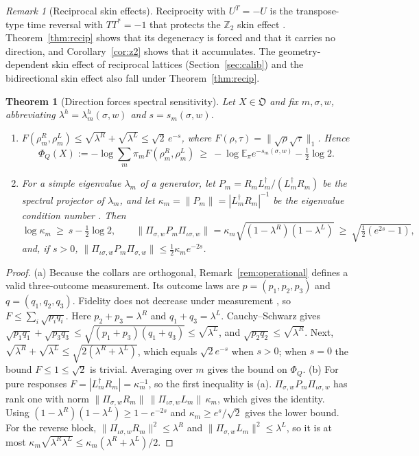 \documentclass[11pt]{article}
\newtheorem{theorem}{Theorem}
\theoremstyle{definition}
\theoremstyle{remark}
\newtheorem{remark}{Remark}
\newcommand{\E}{\mathbb{E}}
\newcommand{\Obj}{\mathfrak{O}}
\newcommand{\isig}{\iota\sigma}
\begin{document}
\begin{remark}[Reciprocal skin effects]\label{rem:z2}
Reciprocity with $U^T=-U$ is the transpose-type time reversal with $TT^*=-1$ \cite{KSUS19} that protects the $\mathbb Z_2$ skin effect \cite{OKSS20}. Theorem~\ref{thm:recip} shows that its degeneracy is forced and that it carries no direction, and Corollary~\ref{cor:z2} shows that it accumulates. The geometry-dependent skin effect of reciprocal lattices \cite{ZYF22,WHWMD23} (Section~\ref{sec:calib}) and the bidirectional skin effect \cite{Wan24} also fall under Theorem~\ref{thm:recip}.
\end{remark}

\begin{theorem}[Direction forces spectral sensitivity]\label{thm:sens}
Let $X\in\Obj$ and fix $m,\sigma,w$, abbreviating $\lambda^h=\lambda^h_m(\sigma,w)$ and $s=s_m(\sigma,w)$.
\begin{enumerate}
\item[(a)] $F(\rho^R_m,\rho^L_m)\le\sqrt{\lambda^R}+\sqrt{\lambda^L}\le\sqrt2\,e^{-s}$, where $F(\rho,\tau)=\|\sqrt\rho\sqrt\tau\|_1$. Hence
\[
\Phi_Q(X):=-\log\sum_m\pi_mF(\rho^R_m,\rho^L_m)\ \ge\ -\log\E_\pi e^{-s_m(\sigma,w)}-\tfrac12\log2 .
\]
\item[(b)] For a simple eigenvalue $\lambda_m$ of a generator, let $P_m=R_mL_m^\dagger/(L_m^\dagger R_m)$ be the spectral projector of $\lambda_m$, and let $\kappa_m=\|P_m\|=|L_m^\dagger R_m|^{-1}$ be the eigenvalue condition number \cite{Wil65,TE05}. Then
\[
\log\kappa_m\ \ge\ s-\tfrac12\log 2,\qquad
\|\Pi_{\sigma,w}P_m\Pi_{\isig,w}\|=\kappa_m\sqrt{(1-\lambda^R)(1-\lambda^L)}\ \ge\ \sqrt{\tfrac12(e^{2s}-1)},
\]
and, if $s>0$, $\|\Pi_{\isig,w}P_m\Pi_{\sigma,w}\|\le\frac12\kappa_me^{-2s}$.
\end{enumerate}
\end{theorem}
\begin{proof}
(a) Because the collars are orthogonal, Remark~\ref{rem:operational} defines a valid three-outcome measurement. Its outcome laws are $p=(p_1,p_2,p_3)$ and $q=(q_1,q_2,q_3)$. Fidelity does not decrease under measurement \cite{Uhl76}, so $F\le\sum_i\sqrt{p_iq_i}$. Here $p_2+p_3=\lambda^R$ and $q_1+q_3=\lambda^L$. Cauchy--Schwarz gives $\sqrt{p_1q_1}+\sqrt{p_3q_3}\le\sqrt{(p_1+p_3)(q_1+q_3)}\le\sqrt{\lambda^L}$, and $\sqrt{p_2q_2}\le\sqrt{\lambda^R}$. Next, $\sqrt{\lambda^R}+\sqrt{\lambda^L}\le\sqrt{2(\lambda^R+\lambda^L)}$, which equals $\sqrt2e^{-s}$ when $s>0$; when $s=0$ the bound $F\le1\le\sqrt2$ is trivial. Averaging over $m$ gives the bound on $\Phi_Q$.
(b) For pure responses $F=|L_m^\dagger R_m|=\kappa_m^{-1}$, so the first inequality is (a). $\Pi_{\sigma,w}P_m\Pi_{\isig,w}$ has rank one with norm $\|\Pi_{\sigma,w}R_m\|\,\|\Pi_{\isig,w}L_m\|\,\kappa_m$, which gives the identity. Using $(1-\lambda^R)(1-\lambda^L)\ge1-e^{-2s}$ and $\kappa_m\ge e^{s}/\sqrt2$ gives the lower bound. For the reverse block, $\|\Pi_{\isig,w}R_m\|^2\le\lambda^R$ and $\|\Pi_{\sigma,w}L_m\|^2\le\lambda^L$, so it is at most $\kappa_m\sqrt{\lambda^R\lambda^L}\le\kappa_m(\lambda^R+\lambda^L)/2$.
\end{proof}
\end{document}

